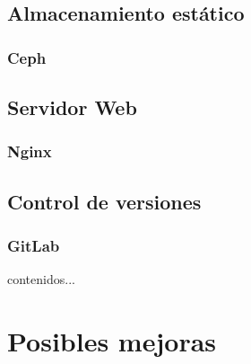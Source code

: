 	\subsection{Almacenamiento estático}
		\subsubsection{Ceph}
	\subsection{Servidor Web}
		\subsubsection{Nginx}
	\subsection{Control de versiones}
	\newpage
		\subsubsection{GitLab}
			\begin{paragraph}
				contenidos...
			\end{paragraph}
		
\section{Posibles mejoras}